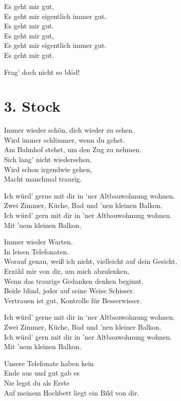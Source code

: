 \documentclass[]{book}
\begin{document}
Es geht mir gut,\\
Es geht mir eigentlich immer gut.\\
Es geht mir gut.\\
Es geht mir gut,\\
Es geht mir eigentlich immer gut.\\
Es geht mir gut.

Frag' doch nicht so blöd!

\hypertarget{stock}{%
\section{3. Stock}\label{stock}}

Immer wieder schön, dich wieder zu sehen.\\
Wird immer schlimmer, wenn du gehst.\\
Am Bahnhof stehst, um den Zug zu nehmen.\\
Sich lang' nicht wiedersehen.\\
Wird schon irgendwie gehen,\\
Macht manchmal traurig.

Ich würd' gerne mit dir in `ner Altbauwohnung wohnen.\\
Zwei Zimmer, Küche, Bad und 'nen kleinen Balkon.\\
Ich würd' gern mit dir in 'ner Altbauwohnung wohnen.\\
Mit 'nem kleinen Balkon.

Immer wieder Warten.\\
In leisen Telefonaten.\\
Worauf genau, weiß ich nicht, vielleicht auf dein Gesicht.\\
Erzähl mir von dir, um mich abzulenken,\\
Wenn das traurige Gedanken denken beginnt.\\
Beide blind, jeder auf seine Weise Schisser.\\
Vertrauen ist gut, Kontrolle für Besserwisser.

Ich würd' gerne mit dir in `ner Altbauwohnung wohnen.\\
Zwei Zimmer, Küche, Bad und 'nen kleiner Balkon.\\
Ich würd' gern mit dir in 'ner Altbauwohnung wohnen.\\
Mit 'nem kleinen Balkon.

Unsere Telefonate haben kein\\
Ende aus und gut gab es\\
Nie legst du als Erste\\
Auf meinem Hochbett liegt ein Bild von dir.
\end{document}
